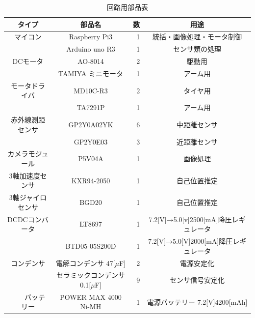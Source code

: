 \begin{table}[hb]
  \centering
  \caption{回路用部品表}
  \begin{tabular}{|c|c|r||c|} \hline
    タイプ & 部品名 & 数 & 用途 \\ \hline \hline
     マイコン & Raspberry Pi3 & 1& 統括・画像処理・モータ制御 \\ \cline{2-4}
   　　& Arduino uno R3& 1 & センサ類の処理 \\ \hline
     DCモータ & AO-8014 & 2 & 駆動用 \\ \cline{2-4}
      & TAMIYA ミニモータ & 1&アーム用  \\ \hline
    モータドライバ& MD10C-R3 & 2& タイヤ用 \\ \cline{2-4}
      &  TA7291P&1 &アーム用 \\ \hline
     赤外線測距センサ& GP2Y0A02YK &6&中距離センサ\\ \cline{2-4}
       &GP2Y0E03&3&近距離センサ \\ \hline
     カメラモジュール&P5V04A&1&画像処理\\ \hline
     3軸加速度センサ&KXR94-2050&1&自己位置推定\\ \hline
     3軸ジャイロセンサ&BGD20&1&自己位置推定\\ \hline
    DCDCコンバータ&LT8697&1& 7.2[V]→5.0[v]2500[mA]降圧レギュレータ\\ \cline{2-4}
       &BTD05-05S200D&1&7.2[V]→5.0[V]2000[mA]降圧レギュレータ\\ \hline
    コンデンサ&電解コンデンサ 47[$\mu$F]&2&電源安定化\\ \cline{2-4}
            &セラミックコンデンサ 0.1[$\mu$F]&9&センサ信号安定化\\ \hline
　　バッテリー&POWER MAX 4000 Ni-MH&1&電源バッテリー 7.2[V]4200[mAh]\\ \hline
                 
  \end{tabular}
  \label{tab:c_parts}
\end{table}

